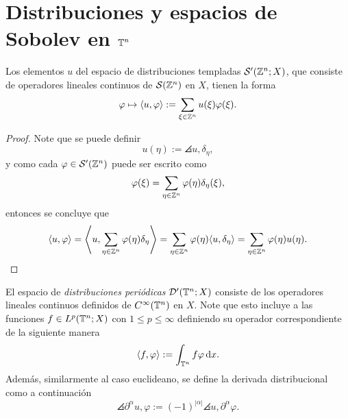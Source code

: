 \section{Distribuciones y espacios de Sobolev en $\mathbb{T}^n$}
\begin{theorem}
	Los elementos $u$ del espacio de distribuciones templadas $\mathcal{S}'(\mathbb{Z}^n;X)$, que consiste de operadores lineales continuos de $\mathcal{S}(\mathbb{Z}^n)$ en $X$,  tienen la forma 
	\begin{equation*}
		\varphi \mapsto \langle u, \varphi\rangle := \sum_{\xi\in\mathbb{Z}^n} u(\xi)\varphi(\xi).
	\end{equation*}
\end{theorem} 
\begin{proof}
	Note que se puede definir 
	\begin{equation*}
		u(\eta) := \angles{u, \delta_\eta},
	\end{equation*}
	y como cada $\varphi\in\mathcal{S}'(\mathbb{Z}^n)$ puede ser escrito como 
	\begin{equation*}
		\varphi(\xi) = \sum_{\eta\in\mathbb{Z}^n} \varphi(\eta)\delta_\eta(\xi),
	\end{equation*}
	entonces se concluye que 
	\begin{equation*}
		\langle u, \varphi\rangle = \left\langle u, \sum_{\eta\in\mathbb{Z}^n}  \varphi(\eta)\delta_\eta \right\rangle = \sum_{\eta\in\mathbb{Z}^n}  \varphi(\eta)\langle u, \delta_\eta\rangle = \sum_{\eta\in\mathbb{Z}^n}  \varphi(\eta)u(\eta).
	\end{equation*}
\end{proof}
\begin{definition}
	El espacio de \textit{distribuciones periódicas} $\mathcal{D}'(\mathbb{T}^n;X)$ consiste de los operadores lineales continuos definidos de $C^\infty(\mathbb{T}^n)$ en $X$. Note que esto incluye a las funciones $f\in L^p(\mathbb{T}^n;X)$ con $1\leq p\leq\infty$ definiendo su operador correspondiente de la siguiente manera
	\begin{equation*}
		\langle f, \varphi\rangle := \int_{\mathbb{T}^n} f\varphi\mathop{}\!\mathrm{d} x.
	\end{equation*}
	Además, similarmente al caso euclideano, se define la derivada distribucional como a continuación 
	\begin{equation*}
		\angles{\partial^\alpha u, \varphi} := (-1)^{|\alpha|}\angles{u, \partial^\alpha\varphi}.
	\end{equation*}
\end{definition}
